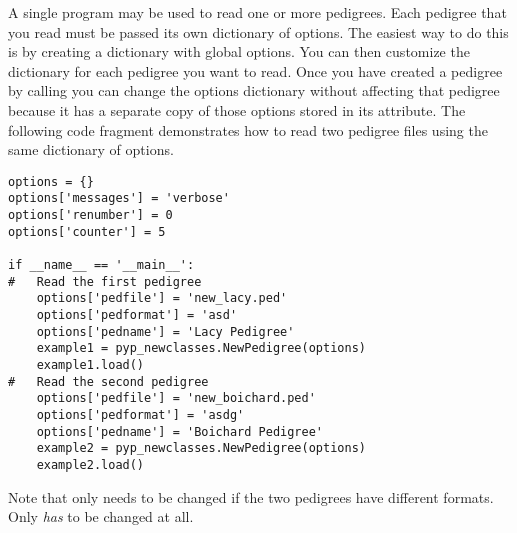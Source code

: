 A single \PyPedal{} program may be used to read one or more pedigrees.  Each pedigree that you read must be passed its own dictionary of options.  The easiest way to do this is by creating a dictionary with global options.  You can then customize the dictionary for each pedigree you want to read.  Once you have created a \PyPedal{} pedigree by calling  you can change the options dictionary without affecting that pedigree because it has a separate copy of those options stored in its  attribute.  The following code fragment demonstrates how to read two pedigree files using the same dictionary of options.
\begin{verbatim}
options = {}
options['messages'] = 'verbose'
options['renumber'] = 0
options['counter'] = 5

if __name__ == '__main__':
#   Read the first pedigree
    options['pedfile'] = 'new_lacy.ped'
    options['pedformat'] = 'asd'
    options['pedname'] = 'Lacy Pedigree'
    example1 = pyp_newclasses.NewPedigree(options)
    example1.load()
#   Read the second pedigree
    options['pedfile'] = 'new_boichard.ped'
    options['pedformat'] = 'asdg'
    options['pedname'] = 'Boichard Pedigree'
    example2 = pyp_newclasses.NewPedigree(options)
    example2.load()
\end{verbatim}
Note that  only needs to be changed if the two pedigrees have different formats.  Only  \emph{has} to be changed at all.

